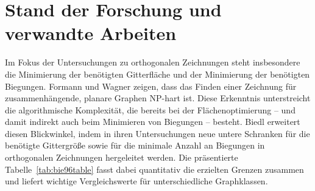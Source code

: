 \documentclass[bachelor, german]{algothesis}
\begin{document}
\section{Stand der Forschung und verwandte Arbeiten}
Im Fokus der Untersuchungen zu orthogonalen Zeichnungen steht insbesondere die Minimierung der benötigten Gitterfläche und der Minimierung der benötigten Biegungen. Formann und Wagner \cite{NP-orth} zeigen, dass das Finden einer  Zeichnung für zusammenhängende, planare Graphen NP-hart ist. Diese Erkenntnis unterstreicht die algorithmische Komplexität, die bereits bei der Flächenoptimierung – und damit indirekt auch beim Minimieren von Biegungen – besteht.\newline
Biedl \cite{Biedl} erweitert diesen Blickwinkel, indem in ihren Untersuchungen neue untere Schranken für die benötigte Gittergröße sowie für die minimale Anzahl an Biegungen in orthogonalen Zeichnungen hergeleitet werden. Die präsentierte Tabelle~\ref{tab:bie96table} fasst dabei quantitativ die erzielten Grenzen zusammen und liefert wichtige Vergleichswerte für unterschiedliche Graphklassen.
\begin{table}[H]
\centering
{}
\caption{Untere Schranken für orthogonale Darstellungen. Ein '–' zeigt an, dass dieser Fall unmöglich ist, während ein '?' darauf hinweist, dass keine besseren unteren Schranken als im Fall zusammenhängender Graphen gefunden wurden\protect\footnotemark}
\label{tab:bie96table}
\end{table}
\end{document}

